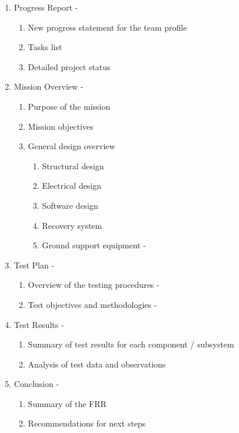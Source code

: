 \begin{enumerate}[label=\arabic*.,leftmargin=*]
    \item Progress Report - \done
    \begin{enumerate}[label=\arabic*.]
        \item New progress statement for the team profile
        \item Tasks list
        \item Detailed project status
    \end{enumerate}
    \item Mission Overview - \done
    \begin{enumerate}[label=\arabic*.]
        \item Purpose of the mission
        \item Mission objectives       
        \item General design overview 
        \begin{enumerate}[label=\arabic*.]
            \item Structural design 
            \item Electrical design       
            \item Software design
            \item Recovery system 
            \item Ground support equipment - \done
        \end{enumerate}
    \end{enumerate}
    \item Test Plan - \done
    \begin{enumerate}[label=\arabic*.]
        \item Overview of the testing procedures - \done
        \item Test objectives and methodologies - \done
    \end{enumerate}
    \item Test Results - \notdone
    \begin{enumerate}[label=\arabic*.]
        \item Summary of test results for each component / subsystem
        \item Analysis of test data and observations
    \end{enumerate}
    \item Conclusion - \done
    \begin{enumerate}[label=\arabic*.]
        \item Summary of the FRR
        \item Recommendations for next steps
    \end{enumerate}
\end{enumerate}

